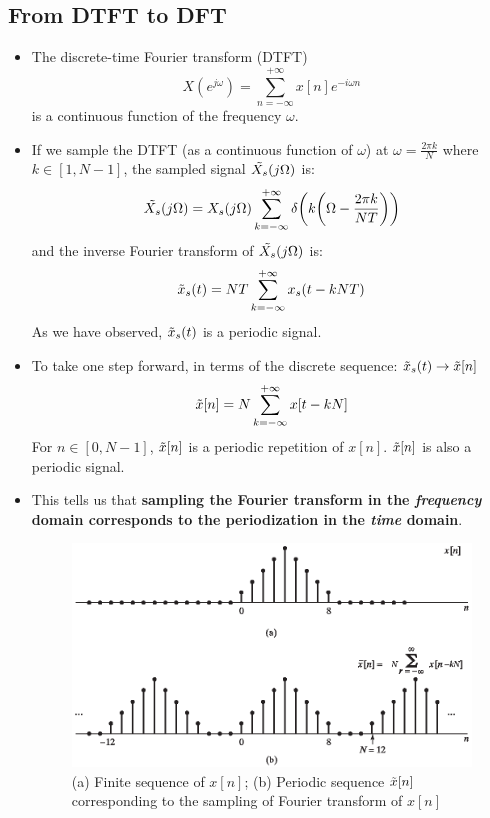 \subsection{From DTFT to DFT}
\begin{itemize}
    \item The discrete-time Fourier transform (DTFT) 
    \[
    X(e^{j\omega}) = \sum_{n=-\infty}^{+\infty} x[n] e^{-i\omega n}
    \]
    is a continuous function of the frequency $\omega$.

    \item If we sample the DTFT (as a continuous function of $\omega$) at $\displaystyle \omega = \frac{2\pi k}{N}$ where $k\in[1, N-1]$, the sampled signal $\Tilde{X_{s}}(j\Omega)$ is:
    \[
    \Tilde{X_{s}}(j\Omega) = X_{s}(j\Omega) \sum_{k=-\infty}^{+\infty} \delta \bigg(k \bigg(\Omega-\frac{2\pi k}{NT} \bigg) \bigg)
    \]
    and the inverse Fourier transform of $\Tilde{X_{s}}(j\Omega)$ is:
    \[
    \Tilde{x}_{s}(t) = NT \sum_{k=-\infty}^{+\infty} x_{s}(t-kNT)
    \]
    As we have observed, $\Tilde{x}_{s}(t)$ is a periodic signal. 

    \item To take one step forward, in terms of the discrete sequence: $\Tilde{x}_{s}(t) \to \Tilde{x}[n]$
    \[
        \Tilde{x}[n] = N \sum_{k=-\infty}^{+\infty} x[t-kN]
    \]
    For $n \in [0, N-1]$, $\Tilde{x}[n]$ is a periodic repetition of $x[n]$. $\Tilde{x}[n]$ is also a periodic signal.
    
    \item This tells us that \textbf{sampling the Fourier transform in the \textit{frequency} domain corresponds to the periodization in the \textit{time} domain}.
    \begin{figure}[H]
        \centering
        \includegraphics{images/DFT_sampling.eps}
        \caption{(a) Finite sequence of $x[n]$; (b) Periodic sequence $\Tilde{x}[n]$ corresponding to the sampling of Fourier transform of $x[n]$}
    \end{figure}
\end{itemize}

